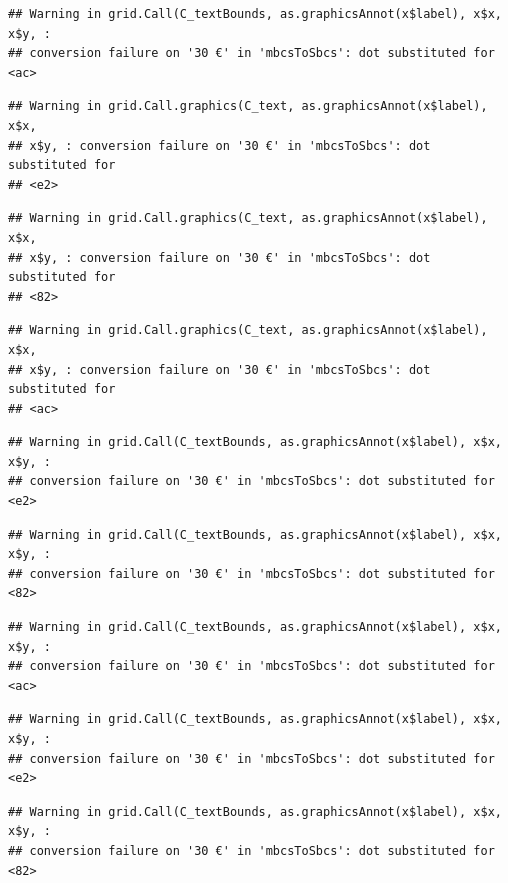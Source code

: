 \documentclass[]{gitbook}
\begin{document}
\begin{verbatim}
## Warning in grid.Call(C_textBounds, as.graphicsAnnot(x$label), x$x, x$y, :
## conversion failure on '30 €' in 'mbcsToSbcs': dot substituted for <ac>
\end{verbatim}

\begin{verbatim}
## Warning in grid.Call.graphics(C_text, as.graphicsAnnot(x$label), x$x,
## x$y, : conversion failure on '30 €' in 'mbcsToSbcs': dot substituted for
## <e2>
\end{verbatim}

\begin{verbatim}
## Warning in grid.Call.graphics(C_text, as.graphicsAnnot(x$label), x$x,
## x$y, : conversion failure on '30 €' in 'mbcsToSbcs': dot substituted for
## <82>
\end{verbatim}

\begin{verbatim}
## Warning in grid.Call.graphics(C_text, as.graphicsAnnot(x$label), x$x,
## x$y, : conversion failure on '30 €' in 'mbcsToSbcs': dot substituted for
## <ac>
\end{verbatim}

\begin{verbatim}
## Warning in grid.Call(C_textBounds, as.graphicsAnnot(x$label), x$x, x$y, :
## conversion failure on '30 €' in 'mbcsToSbcs': dot substituted for <e2>
\end{verbatim}

\begin{verbatim}
## Warning in grid.Call(C_textBounds, as.graphicsAnnot(x$label), x$x, x$y, :
## conversion failure on '30 €' in 'mbcsToSbcs': dot substituted for <82>
\end{verbatim}

\begin{verbatim}
## Warning in grid.Call(C_textBounds, as.graphicsAnnot(x$label), x$x, x$y, :
## conversion failure on '30 €' in 'mbcsToSbcs': dot substituted for <ac>
\end{verbatim}

\begin{verbatim}
## Warning in grid.Call(C_textBounds, as.graphicsAnnot(x$label), x$x, x$y, :
## conversion failure on '30 €' in 'mbcsToSbcs': dot substituted for <e2>
\end{verbatim}

\begin{verbatim}
## Warning in grid.Call(C_textBounds, as.graphicsAnnot(x$label), x$x, x$y, :
## conversion failure on '30 €' in 'mbcsToSbcs': dot substituted for <82>
\end{verbatim}
\end{document}
